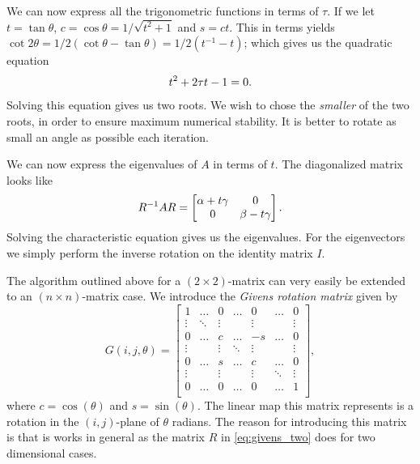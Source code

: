 \documentclass[a4paper, 10pt]{amsart}
\begin{document}
We can now express all the trigonometric functions in terms of $\tau$. If we let
$t = \tan \theta$, $c = \cos \theta = 1 / \sqrt{t^2 + 1}$ and $s = ct$. This in
terms yields $\cot 2\theta = 1/2 (\cot \theta - \tan \theta) = 1/2 (t^{-1} -
t)$; which gives us the quadratic equation
\begin{equation}
  \notag
  t^2 + 2\tau t - 1 = 0.
\end{equation}
Solving this equation gives us two roots. We wish to chose the \emph{smaller}
of the two roots, in order to ensure maximum numerical stability. It is better
to rotate as small an angle as possible each iteration.

We can now express the eigenvalues of $A$ in terms of $t$. The diagonalized
matrix looks like
\begin{equation}
  \notag
  R^{-1}AR = \begin{bmatrix}
    \alpha + t\gamma & 0 \\
    0 & \beta - t\gamma
  \end{bmatrix}.
\end{equation}
Solving the characteristic equation gives us the eigenvalues. For the
eigenvectors we simply perform the inverse rotation on the identity matrix $I$.

The algorithm outlined above for a $(2 \times 2)$-matrix can very easily be
extended to an $(n\times n)$-matrix case. We introduce the \emph{Givens rotation
  matrix} given by
\begin{equation}
  \label{eq:givens}
  G(i, j, \theta) = \begin{bmatrix}
    1 & \hdots & 0 &\hdots & 0 & \hdots & 0 \\
    \vdots & \ddots & \vdots & {} & \vdots & {} & \vdots \\
    0 & \hdots & c &\hdots & -s & \hdots & 0 \\
    \vdots & {} & \vdots & \ddots & \vdots & {} & \vdots \\
    0 & \hdots & s &\hdots & c & \hdots & 0 \\
    \vdots & {} & \vdots & {} & \vdots & \ddots & \vdots \\
    0 & \hdots & 0 &\hdots & 0 & \hdots & 1 \\
  \end{bmatrix},
\end{equation}
where $c = \cos(\theta)$ and $s = \sin(\theta)$. The linear map this matrix
represents is a rotation in the $(i, j)$-plane of $\theta$ radians.  The reason
for introducing this matrix is that is works in general as the matrix $R$ in
\cref{eq:givens_two} does for two dimensional cases.
\end{document}
